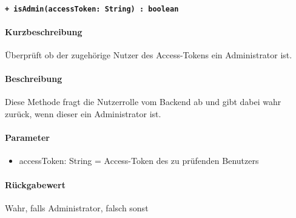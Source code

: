 \paragraph{\texttt{+ isAdmin(accessToken: String) : boolean}}\label{AP_Framework_isAdmin}%
\paragraph*{Kurzbeschreibung}
Überprüft ob der zugehörige Nutzer des Access-Tokens ein Administrator ist.
\paragraph*{Beschreibung}
Diese Methode fragt die Nutzerrolle vom Backend ab und gibt dabei wahr zurück, wenn dieser ein Administrator ist.
\paragraph*{Parameter}
\begin{itemize}
    \item accessToken: String = Access-Token des zu prüfenden Benutzers
\end{itemize}
\paragraph*{Rückgabewert}
Wahr, falls Administrator, falsch sonst